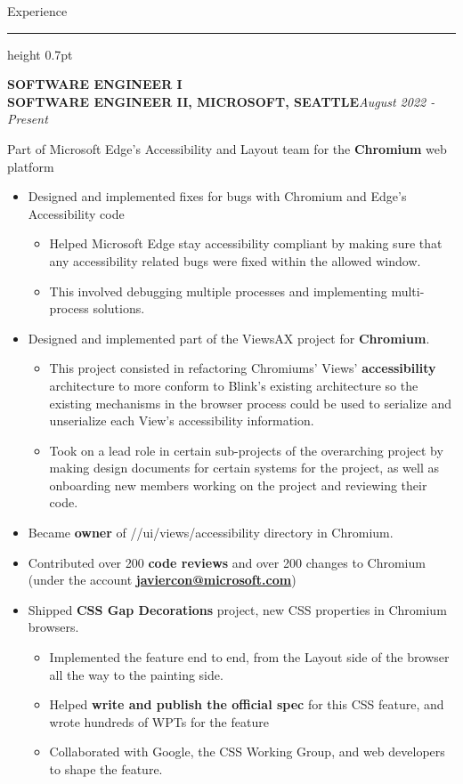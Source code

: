 \documentclass[10pt,letterpaper]{article}
\newcommand{\resumesection}[1]{%
  \par\addvspace{5pt}%
  {\fontsize{12}{13}\selectfont #1\par}%
  \vspace{0.5pt}\hrule height 0.7pt\vspace{3pt}%
}
\newcommand{\role}[2]{%
  \par\addvspace{6pt}%
  \textbf{#1}\hfill\textit{#2}\par\nobreak
}
\newcommand{\resumelink}[2]{\href{#1}{\uline{#2}}}
\begin{document}
\resumesection{Experience}
\role{SOFTWARE ENGINEER I\\SOFTWARE ENGINEER II, MICROSOFT, SEATTLE}{August 2022 - Present}
Part of Microsoft Edge’s Accessibility and Layout team for the \textbf{Chromium} web platform
\begin{itemize}
  \item Designed and implemented fixes for bugs with Chromium and Edge’s Accessibility code
  \begin{itemize}
    \item Helped Microsoft Edge stay accessibility compliant by making sure that any accessibility related bugs were fixed within the allowed window.
    \item This involved debugging multiple processes and implementing multi-process solutions.
  \end{itemize}
  \item Designed and implemented part of the ViewsAX project for \textbf{Chromium}.
  \begin{itemize}
    \item This project consisted in refactoring Chromiums’ Views’ \textbf{accessibility} architecture to more conform to Blink’s existing architecture so the existing mechanisms in the browser process could be used to serialize and unserialize each View’s accessibility information.
    \item Took on a lead role in certain sub-projects of the overarching project by making design documents for certain systems for the project, as well as onboarding new members working on the project and reviewing their code.
  \end{itemize}
  \item Became \textbf{owner} of //ui/views/accessibility directory in Chromium.
  \item Contributed over 200 \textbf{code reviews} and over 200 changes to Chromium (under the account \resumelink{mailto:javiercon@microsoft.com}{\textbf{javiercon@microsoft.com}})
  \item Shipped \textbf{CSS Gap Decorations} project, new CSS properties in Chromium browsers.
  \begin{itemize}
    \item Implemented the feature end to end, from the Layout side of the browser all the way to the painting side.
    \item Helped \textbf{write and publish the official spec} for this CSS feature, and wrote hundreds of WPTs for the feature
    \item Collaborated with Google, the CSS Working Group, and web developers to shape the feature.

\end{itemize}
\end{itemize}
\end{document}
